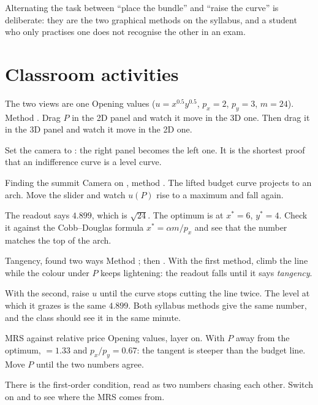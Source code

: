 \documentclass[11pt,a4paper]{appletmanual}
\begin{document}
\begin{amnote}
Alternating the task between ``place the bundle'' and ``raise the curve'' is
deliberate: they are the two graphical methods on the syllabus, and a student
who only practises one does not recognise the other in an exam.
\end{amnote}

\section{Classroom activities}

\begin{activity}{The two views are one}
\amset Opening values ($u = x^{0.5}y^{0.5}$, $p_x = 2$, $p_y = 3$, $m = 24$).
Method .
\amexp Drag $P$ in the 2D panel and watch it move in the 3D one. Then drag it
in the 3D panel and watch it move in the 2D one.
\par\smallskip
Set the camera to : the right panel becomes the left one. It is the
shortest proof that an indifference curve is a level curve.
\end{activity}

\begin{activity}{Finding the summit}
\amset Camera on , method .
\amexp The lifted budget curve projects to an arch. Move the slider and watch
$u(P)$ rise to a maximum and fall again.
\par\smallskip
The  readout says $4.899$, which is $\sqrt{24}$. The optimum is at
$x^\ast = 6$, $y^\ast = 4$. Check it against the Cobb--Douglas formula
$x^\ast = \alpha m/p_x$ and see that the number matches the top of the arch.
\end{activity}

\begin{activity}{Tangency, found two ways}
\amset Method ; then .
\amexp With the first method, climb the line while the colour under $P$ keeps
lightening: the  readout falls until it says \emph{tangency}.
\par\smallskip
With the second, raise $u$ until the curve stops cutting the line twice. The
level at which it grazes is the same $4.899$. Both syllabus methods give the
same number, and the class should see it in the same minute.
\end{activity}

\begin{activity}{MRS against relative price}
\amset Opening values,  layer on.
\amexp With $P$ away from the optimum,  $= 1.33$ and
$p_x/p_y = 0.67$: the tangent is steeper than the budget line. Move $P$ until
the two numbers agree.
\par\smallskip
There is the first-order condition, read as two numbers chasing each other.
Switch on  and  to see where the MRS comes from.
\end{activity}
\end{document}
